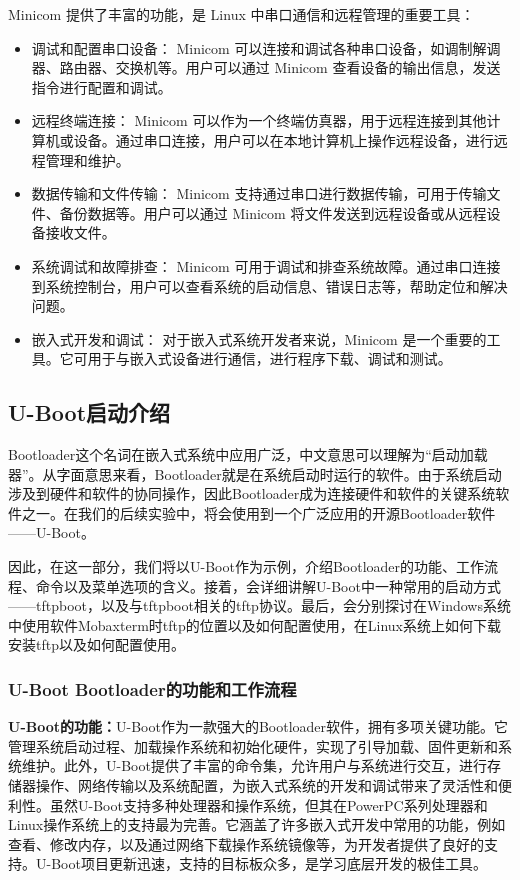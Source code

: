 Minicom 提供了丰富的功能，是 Linux 中串口通信和远程管理的重要工具：

\begin{itemize}
	\item 调试和配置串口设备： Minicom 可以连接和调试各种串口设备，如调制解调器、路由器、交换机等。用户可以通过 Minicom 查看设备的输出信息，发送指令进行配置和调试。

	\item 远程终端连接： Minicom 可以作为一个终端仿真器，用于远程连接到其他计算机或设备。通过串口连接，用户可以在本地计算机上操作远程设备，进行远程管理和维护。

	\item 数据传输和文件传输： Minicom 支持通过串口进行数据传输，可用于传输文件、备份数据等。用户可以通过 Minicom 将文件发送到远程设备或从远程设备接收文件。

	\item 系统调试和故障排查： Minicom 可用于调试和排查系统故障。通过串口连接到系统控制台，用户可以查看系统的启动信息、错误日志等，帮助定位和解决问题。

	\item 嵌入式开发和调试： 对于嵌入式系统开发者来说，Minicom 是一个重要的工具。它可用于与嵌入式设备进行通信，进行程序下载、调试和测试。
\end{itemize}

\subsection{U-Boot启动介绍}

Bootloader这个名词在嵌入式系统中应用广泛，中文意思可以理解为“启动加载器”。从字面意思来看，Bootloader就是在系统启动时运行的软件。由于系统启动涉及到硬件和软件的协同操作，因此Bootloader成为连接硬件和软件的关键系统软件之一。在我们的后续实验中，将会使用到一个广泛应用的开源Bootloader软件——U-Boot。

因此，在这一部分，我们将以U-Boot作为示例，介绍Bootloader的功能、工作流程、命令以及菜单选项的含义。接着，会详细讲解U-Boot中一种常用的启动方式——tftpboot，以及与tftpboot相关的tftp协议。最后，会分别探讨在Windows系统中使用软件Mobaxterm时tftp的位置以及如何配置使用，在Linux系统上如何下载安装tftp以及如何配置使用。

\subsubsection{U-Boot Bootloader的功能和工作流程}


    \textbf{ U-Boot的功能：}U-Boot作为一款强大的Bootloader软件，拥有多项关键功能。它管理系统启动过程、加载操作系统和初始化硬件，实现了引导加载、固件更新和系统维护。此外，U-Boot提供了丰富的命令集，允许用户与系统进行交互，进行存储器操作、网络传输以及系统配置，为嵌入式系统的开发和调试带来了灵活性和便利性。虽然U-Boot支持多种处理器和操作系统，但其在PowerPC系列处理器和Linux操作系统上的支持最为完善。它涵盖了许多嵌入式开发中常用的功能，例如查看、修改内存，以及通过网络下载操作系统镜像等，为开发者提供了良好的支持。U-Boot项目更新迅速，支持的目标板众多，是学习底层开发的极佳工具。
    
